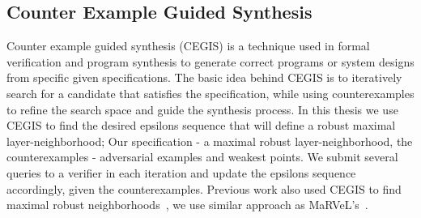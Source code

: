 \subsection{Counter Example Guided Synthesis}
Counter example guided synthesis (CEGIS) is a technique used in formal verification and program synthesis to generate correct programs or system designs from specific given specifications.
The basic idea behind CEGIS is to iteratively search for a candidate that satisfies the specification, while using counterexamples to refine the search space and guide the synthesis process.
In this thesis we use CEGIS to find the desired epsilons sequence that will define a robust maximal layer-neighborhood;
Our specification - a maximal robust layer-neighborhood, the counterexamples - adversarial examples and weakest points.
We submit several queries to a verifier in each iteration and update the epsilons sequence accordingly, given the counterexamples.
Previous work also used CEGIS to find maximal robust neighborhoods~\cite{CEGIS1, MARVEL, CEGIS2, CEGIS3}, we use similar approach as MaRVeL's~\cite{MARVEL}.